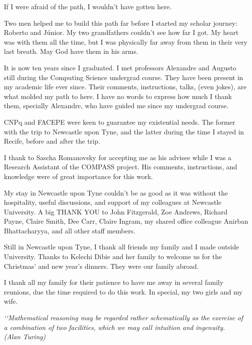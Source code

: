 \documentclass[12pt,openright,twoside,a4paper,oldfontcommands,english,brazil,final]{abntex2}
\theoremstyle{theo}
\begin{document}
\begin{agradecimentos}

If I were afraid of the path, I wouldn't have gotten here.

Two men helped me to build this path far before I started my scholar journey: Roberto and Júnior.
My two grandfathers couldn't see how far I got.
My heart was with them all the time, but I was physically far away from them in their very last breath.
May God have them in his arms.

It is now ten years since I graduated.
I met professors Alexandre and Augusto still during the Computing Science undergrad course.
They have been present in my academic life ever since.
Their comments, instructions, talks, (even jokes), are what molded my path to here.
I have no words to express how much I thank them, specially Alexandre, who have guided me since my undergrad course.

CNPq and FACEPE were keen to guarantee my existential needs.
The former with the trip to Newcastle upon Tyne, and the latter during the time I stayed in Recife, before and after the trip.

I thank to Sascha Romanovsky for accepting me as his advisee while I was a Research Assistant of the COMPASS project.
His comments, instructions, and knowledge were of great importance for this work.

My stay in Newcastle upon Tyne couldn't be as good as it was without the hospitality, useful discussions, and support of my colleagues at Newcastle University.
A big THANK YOU to John Fitzgerald, Zoe Andrews, Richard Payne, Claire Smith, Dee Carr, Claire Ingram, my shared office colleague Anirban Bhattacharyya, and all other staff members.

Still in Newcastle upon Tyne, I thank all friends my family and I made outside University.
Thanks to Kelechi Dibie and her family to welcome us for the Christmas' and new year's dinners.
They were our family abroad.

I thank all my family for their patience to have me away in several family reunions, due the time required to do this work.
In special, my two girls and my wife.

\end{agradecimentos}

\begin{epigrafe}

  \vspace*{\fill}
  \begin{flushright}
  \textit{‘‘Mathematical reasoning may be regarded
  rather schematically as the exercise of a combination of two facilities,
  which we may call intuition and ingenuity.\\
  (Alan Turing)}
  \end{flushright}

\end{epigrafe}
\end{document}
